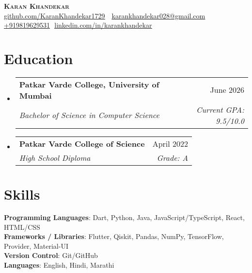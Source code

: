 \documentclass[letterpaper,11pt]{article}
\makeatletter
\newcommand{\resumeSubheading}[4]{
  \vspace{-2pt}\item
    \begin{tabular*}{0.97\textwidth}[t]{l@{\extracolsep{\fill}}r}
      \textbf{#1} & #2 \\
      \textit{\small#3} & \textit{\small #4} \\
    \end{tabular*}\vspace{-7pt}
}
\newcommand{\resumeSubHeadingListStart}{\begin{itemize}[leftmargin=0.15in, label={}]}
\newcommand{\resumeSubHeadingListEnd}{\end{itemize}}
\makeatother
\begin{document}
\begin{flushright}
  \vspace{-4pt}
\end{flushright}

\vspace{-7pt}

\begin{center}
    \textbf{\Huge \scshape Karan Khandekar} \\ \vspace{8pt}
    \small 
    \faGithub
    \href{github.com/KaranKhandekar1729}{\underline{github.com/KaranKhandekar1729}} $  $
    \faEnvelope$  $
    \href{mailto:karankhandekar028@gmail.com}
    {\underline{karankhandekar028@gmail.com}}
    \faPhone$  $
    \underline{+919819629531}
    \faLinkedin$  $
    \href{linkedin.com/in/karankhandekar}{\underline{linkedin.com/in/karankhandekar}} $  $
\end{center}

\section{Education}
  \resumeSubHeadingListStart
    \resumeSubheading
        {Patkar Varde College, University of Mumbai}{June 2026}
        {Bachelor of Science in Computer Science}{Current GPA: 9.5/10.0}
  
    \resumeSubheading
      {Patkar Varde College of Science}{April 2022}
      {High School Diploma}{Grade: A}
      

  \resumeSubHeadingListEnd

\section{Skills}
\begin{itemize}[leftmargin=0.15in, label={}]
\small{\item{
    \textbf{Programming Languages}{: Dart, Python, Java, JavaScript/TypeScript, React, HTML/CSS} \\
    
    \textbf{Frameworks / Libraries}{: Flutter, Qiskit, Pandas, NumPy, TensorFlow, Provider, Material-UI} \\
    
    \textbf{Version Control}{: Git/GitHub} \\
    
    \textbf{Languages}{: English, Hindi, Marathi} \\
}}
\end{itemize}
\end{document}
